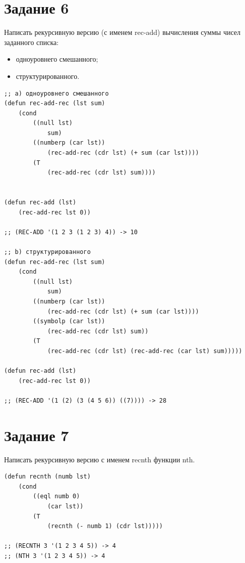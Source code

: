 \documentclass[a4paper,14pt, unknownkeysallowed]{extreport}
\begin{document}
\section{Задание 6}

Написать рекурсивную версию (с именем rec-add) вычисления суммы чисел заданного списка:

\begin{itemize}
	\item одноуровнего смешанного;
	\item структурированного.
\end{itemize}

\begin{center}
\captionsetup{justification=raggedright,singlelinecheck=off}
\begin{lstlisting}[label=lst:parallel_processing,caption=Решение задания 6]
;; а) одноуровнего смешанного
(defun rec-add-rec (lst sum)
	(cond  
		((null lst)
			sum)
		((numberp (car lst))
			(rec-add-rec (cdr lst) (+ sum (car lst))))
		(T 
			(rec-add-rec (cdr lst) sum))))

			
(defun rec-add (lst)
	(rec-add-rec lst 0))

;; (REC-ADD '(1 2 3 (1 2 3) 4)) -> 10

;; b) структурированного
(defun rec-add-rec (lst sum)
    (cond  
        ((null lst)
            sum)
        ((numberp (car lst))
            (rec-add-rec (cdr lst) (+ sum (car lst))))
        ((symbolp (car lst))
            (rec-add-rec (cdr lst) sum))
        (T
            (rec-add-rec (cdr lst) (rec-add-rec (car lst) sum)))))

(defun rec-add (lst)
	(rec-add-rec lst 0))

;; (REC-ADD '(1 (2) (3 (4 5 6)) ((7)))) -> 28
\end{lstlisting}
\end{center}

\section{Задание 7}

Написать рекурсивную версию с именем recnth функции nth.

\begin{center}
\captionsetup{justification=raggedright,singlelinecheck=off}
\begin{lstlisting}[label=lst:parallel_processing,caption=Решение задания 7]
(defun recnth (numb lst)
    (cond 
        ((eql numb 0)
            (car lst))
        (T 
            (recnth (- numb 1) (cdr lst)))))

;; (RECNTH 3 '(1 2 3 4 5)) -> 4
;; (NTH 3 '(1 2 3 4 5)) -> 4
\end{lstlisting}
\end{center}
\end{document}
